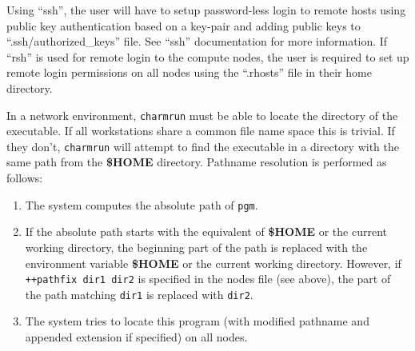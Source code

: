 Using ``ssh'', the user will have to setup
password-less login to remote hosts using
public key authentication based on a key-pair and adding public keys to
``.ssh/authorized\_keys'' file. See ``ssh'' documentation for more information.
If ``rsh'' is used for remote
login to the compute nodes, the user is required to set up remote login permissions on all nodes
using the ``.rhosts'' file in their home directory.

In a network environment, {\tt charmrun} must
be able to locate the directory of the executable.  If all workstations
share a common file name space this is trivial.  If they don't, {\tt charmrun}
will attempt to find the executable in a directory with the same path
from the {\bf \$HOME} directory.  Pathname resolution is performed as
follows:
\begin{enumerate}
	\item The system computes the absolute path of {\tt pgm}.
	\item If the absolute path starts with the equivalent of {\bf \$HOME}
	or the current working directory, the beginning part of the
        path
	is replaced with the environment variable {\bf \$HOME} or the
	current working directory. However, if {\tt ++pathfix dir1 dir2} is
        specified in the nodes file (see above), the part of
        the path matching {\tt dir1} is replaced with {\tt dir2}.
	\item The system tries to locate this program (with modified
	pathname and appended extension if specified) on all nodes.
\end{enumerate}


